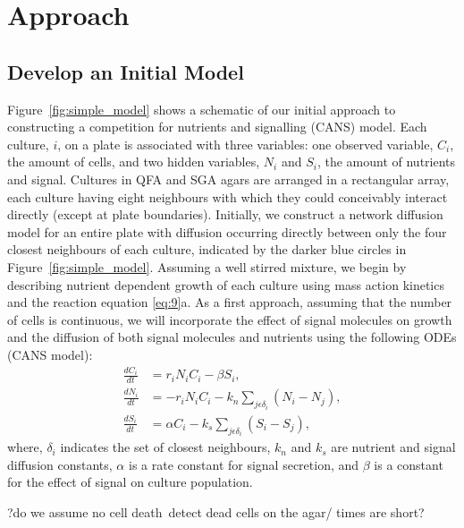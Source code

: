 \graphicspath{{images_low_res/}}
\section{Approach}
\label{sec:approach}

\subsection{Develop an Initial Model}
\label{sec:initial_model}

Figure~\ref{fig:simple_model} shows a schematic of our initial
approach to constructing a competition for nutrients and signalling
(CANS) model. Each culture, \(i\), on a plate is associated with three
variables: one observed variable, \(C_{i}\), the amount of cells, and
two hidden variables, \(N_{i}\) and \(S_{i}\), the amount of nutrients
and signal. Cultures in QFA and SGA agars are arranged in a
rectangular array, each culture having eight neighbours with which
they could conceivably interact directly (except at plate
boundaries). Initially, we construct a network diffusion model for an
entire plate with diffusion occurring directly between only the four
closest neighbours of each culture, indicated by the darker blue
circles in Figure~\ref{fig:simple_model}. Assuming a well stirred
mixture, we begin by describing nutrient dependent growth of each
culture using mass action kinetics and the reaction equation
\ref{eq:9}a. As a first approach, assuming that the number of cells
is continuous, we will incorporate the effect of signal molecules on
growth and the diffusion of both signal molecules and nutrients using
the following ODEs (CANS model):
\begin{subequations}
  \label{eq:5}
  \begin{align}
    \frac{dC_{i}}{dt}& = r_{i}N_{i}C_{i} - \beta S_{i},\\
    \frac{dN_{i}}{dt}& = - r_{i}N_{i}C_{i} - k_{n}\sum_{j \epsilon \delta_i}(N_{i} - N_{j}),\\
    \frac{dS_{i}}{dt}& = \alpha C_{i} - k_{s}\sum_{j \epsilon \delta_i}(S_{i} - S_{j}),
  \end{align}
\end{subequations}
where, \(\delta_i\) indicates the set of closest neighbours, \(k_{n}\)
and \(k_{s}\) are nutrient and signal diffusion constants, \(\alpha\)
is a rate constant for signal secretion, and \(\beta\) is a constant
for the effect of signal on culture population.

 ?do we assume no cell
death\ detect dead cells on the agar/ times are short?


